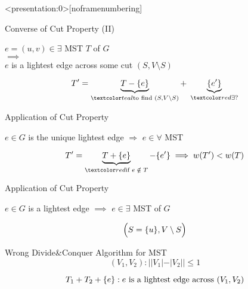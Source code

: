 \begin{frame}<presentation:0>[noframenumbering]
  \begin{exampleblock}{Converse of Cut Property (II)}
    \begin{center}
      $e = (u,v) \in \exists$ MST $T$ of $G$ \\[6pt]
      $\implies$ \\[6pt]
      $e$ is a lightest edge across some cut $(S, V \setminus S)$
    \end{center}
  \end{exampleblock}

  \pause
  \[
    T' = \underbrace{T - \set{e}}_{\teal{\text{to find } (S, V \setminus S)}} +\; \underbrace{\set{e'}}_{\red{\exists?}}
  \]
\end{frame}

\begin{frame}{}
  \begin{exampleblock}{Application of Cut Property }
    \centerline{$e \in G$ is the unique lightest edge $\Rightarrow$ $e \in \forall$ MST}
  \end{exampleblock}

  \pause
  \vspace{0.50cm}
  \[
    T' = \underbrace{T + \set{e}}_{\red{\text{if } e \;\notin\; T}} - \set{e'} \implies w(T') < w(T)
  \]
\end{frame}

\begin{frame}{}
  \begin{exampleblock}{Application of Cut Property }
    \centerline{$e \in G$ is a lightest edge $\implies$ $e \in \exists$ MST of $G$}
  \end{exampleblock}

  \pause
  \[
    \Big(S = \{u\}, V \setminus S\Big)
  \]
\end{frame}

\begin{frame}{}
  \begin{exampleblock}{Wrong Divide\&Conquer Algorithm for MST }
    \[
      (V_{1}, V_{2}): ||V_{1}| - |V_{2}|| \le 1
    \]
    
    \[
      T_{1} + T_{2} + \{e\}: e \text{ is a lightest edge across } (V_{1}, V_{2})
    \]
  \end{exampleblock}

  \pause
  \vspace{0.30cm}
\end{frame}
